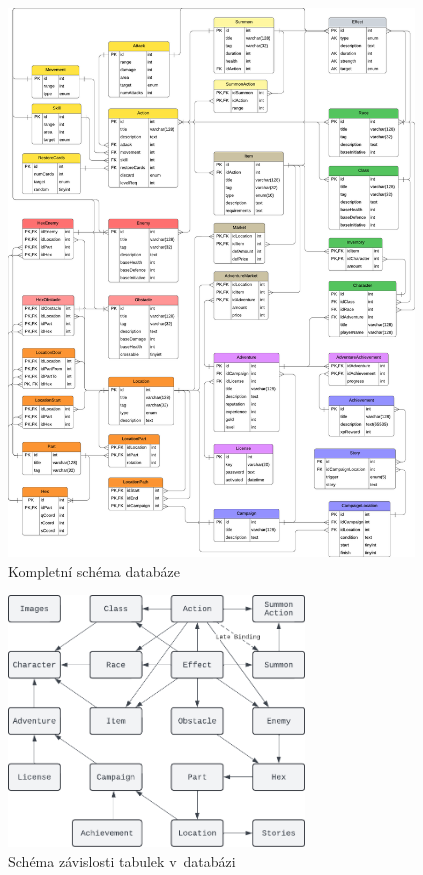 \begin{figure}[H]
    \centering
    \includegraphics[width=0.96\textwidth]{../../shared/diagrams/dbScheme}
    \caption{Kompletní schéma databáze}
    \label{fig:db_scheme}
\end{figure}

\begin{figure}[H]
    \centering
    \includegraphics[width=0.7\textwidth]{diagrams/databasePriority}
    \caption{Schéma závislosti tabulek v~databázi}
    \label{fig:db_table_priority}
\end{figure}

